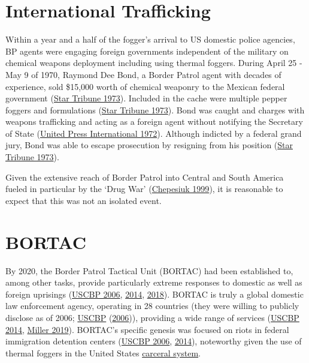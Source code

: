 \documentclass[
  11pt,
]{krantz}
\begin{document}
\hypertarget{international-trafficking}{%
\section{International Trafficking}\label{international-trafficking}}

Within a year and a half of the fogger's arrival to US domestic police agencies, BP agents were engaging foreign governments independent of the military on chemical weapons deployment including using thermal foggers.
During April 25 - May 9 of 1970, Raymond Dee Bond, a Border Patrol agent with decades of experience, sold \$15,000 worth of chemical weaponry to the Mexican federal government (\protect\hyperlink{ref-ValleyMorningStar1973_08_04}{Star Tribune 1973}).
Included in the cache were multiple pepper foggers and formulations (\protect\hyperlink{ref-ValleyMorningStar1973_08_04}{Star Tribune 1973}).
Bond was caught and charges with weapons trafficking and acting as a foreign agent without notifying the Secretary of State (\protect\hyperlink{ref-DailyNews1972_10_27}{United Press International 1972}).
Although indicted by a federal grand jury, Bond was able to escape prosecution by resigning from his position (\protect\hyperlink{ref-ValleyMorningStar1973_08_04}{Star Tribune 1973}).

Given the extensive reach of Border Patrol into Central and South America fueled in particular by the `Drug War' (\protect\hyperlink{ref-Chepesiuk1999}{Chepesiuk 1999}), it is reasonable to expect that this was not an isolated event.

\hypertarget{bortac}{%
\section{BORTAC}\label{bortac}}

By 2020, the Border Patrol Tactical Unit (BORTAC) had been established to, among other tasks, provide particularly extreme responses to domestic as well as foreign uprisings (\protect\hyperlink{ref-CBP2006}{USCBP 2006}, \protect\hyperlink{ref-CBP2014}{2014}, \protect\hyperlink{ref-CBP2018}{2018}).
BORTAC is truly a global domestic law enforcement agency, operating in 28 countries (they were willing to publicly disclose as of 2006; \protect\hyperlink{ref-CBP2006}{USCBP} (\protect\hyperlink{ref-CBP2006}{2006})), providing a wide range of services (\protect\hyperlink{ref-CBP2014}{USCBP 2014}, \protect\hyperlink{ref-Miller2019}{Miller 2019}).
BORTAC's specific genesis was focused on riots in federal immigration detention centers (\protect\hyperlink{ref-CBP2006}{USCBP 2006}, \protect\hyperlink{ref-CBP2014}{2014}), noteworthy given the use of thermal foggers in the United States \protect\hyperlink{CarceralSystem}{carceral system}.
\end{document}
